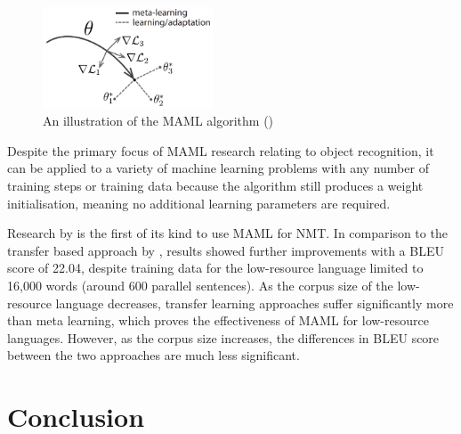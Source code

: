 \begin{figure}[ht!]
\centering
\includegraphics[width=0.45\textwidth]{media/literature/nmt_approaches/maml.png}
\caption[Diagram of a \gls{MAML} algorithm]{An illustration of the \Gls{MAML} algorithm (\cite{finn_model-agnostic_2017})}
\label{fig:MAML}
\end{figure}

Despite the primary focus of \acrshort{MAML} research relating to object recognition, it can be applied to a variety of machine learning problems with any number of training steps or training data because the algorithm still produces a weight initialisation, meaning no additional learning parameters are required.



%
%

Research by \cite{gu_meta-learning_2018} is the first of its kind to use \acrshort{MAML} for \acrshort{NMT}. In comparison to the transfer based approach by \cite{zoph_transfer_2016}, results showed further improvements with a BLEU score of 22.04, despite training data for the low-resource language limited to 16,000 words (around 600 parallel sentences). As the corpus size of the low-resource language decreases, transfer learning approaches suffer significantly more than meta learning, which proves the effectiveness of \acrshort{MAML} for low-resource languages. However, as the corpus size increases, the differences in BLEU score between the two approaches are much less significant.

\section{Conclusion}

